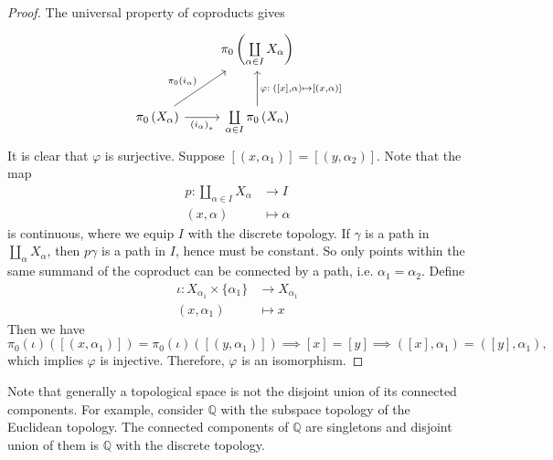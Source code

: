 \documentclass{report}
\theoremstyle{nonumberplain}
\newtheorem{proof}{Proof.}
\begin{document}
\begin{proof}
	The universal property of coproducts gives
	\begin{equation*}
		\begin{tikzcd}		
			& \pi_0\left(\coprod\limits_{\alpha\in I} X_\alpha\right) \\ [10pt]
			\pi_0\left(X_\alpha\right) \arrow[ru, "\pi_0\left(i_\alpha\right)"] \arrow[r, "\left(i_\alpha \right)_{*}"']
			& \coprod\limits_{\alpha\in I} \pi_0\left(X_\alpha\right)
			\arrow[u, "\varphi:\;\left({[x],}\alpha\right)\mapsto{[(x,\alpha)]}"'] 
		\end{tikzcd}			
	\end{equation*}
	It is clear that $\varphi$ is surjective. Suppose $[(x,\alpha_1)]=[(y,\alpha_2)]$. Note that the map
	\begin{align*}
		p: \coprod_{\alpha\in I} X_\alpha& \longrightarrow I\\
		(x, \alpha) &\longmapsto \alpha
	\end{align*}
	is continuous, where we equip $I$ with the discrete topology. If $\gamma$ is a path in $\coprod_\alpha X_\alpha$, then $p \gamma$ is a path in $I$, hence must be constant. So only points within the same summand of the coproduct can be connected by a path, i.e. $\alpha_1=\alpha_2$. Define
	\begin{align*}
		\iota: X_{\alpha_1} \times\{\alpha_1\}&\longrightarrow  X_{\alpha_1}\\
		(x, \alpha_1) &\longmapsto x
	\end{align*}
	Then we have
	\[
		\pi_0(\iota)\left([(x,\alpha_1)]\right)=\pi_0(\iota)\left([(y,\alpha_1)]\right)\implies [x]=[y]\implies ([x],\alpha_1)=([y],\alpha_1),
	\]
	which implies $\varphi$ is injective. Therefore, $\varphi$ is an isomorphism.
\end{proof}
Note that generally a topological space is not the disjoint union of its connected components. For example, consider $\mathbb{Q}$ with the subspace topology of the Euclidean topology. The connected components of $\mathbb{Q}$ are singletons and disjoint union of them is $\mathbb{Q}$ with the discrete topology.
\end{document}
